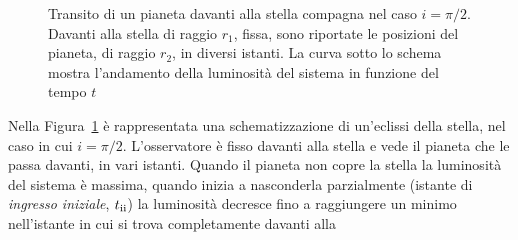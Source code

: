 \begin{figure}
  \centering
  \caption[Transito di un pianeta davanti alla stella compagna nel caso
  $i = \pi/2$]{Transito di un pianeta davanti alla stella compagna nel caso $i =
    \pi/2$. Davanti alla stella di raggio $r_1$, fissa, sono riportate le
    posizioni del pianeta, di raggio $r_2$, in diversi istanti. La curva sotto
    lo schema mostra l'andamento della luminosità del sistema in funzione del
    tempo $t$}
  \label{fig:schema-transito}
\end{figure}
Nella Figura~\ref{fig:schema-transito} è rappresentata una schematizzazione di
un'eclissi della stella, nel caso in cui $i = \pi/2$. L'osservatore è fisso
davanti alla stella e vede il pianeta che le passa davanti, in vari
istanti. Quando il pianeta non copre la stella la luminosità del sistema è
massima, quando inizia a nasconderla parzialmente (istante di
\emph{ingresso iniziale}, $t_{\textup{ii}}$) la luminosità decresce fino a
raggiungere un minimo nell'istante in cui si trova completamente davanti alla
